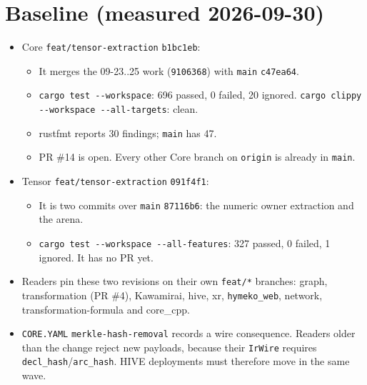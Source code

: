 \documentclass[11pt,a4paper]{article}
\newcommand{\code}[1]{\texttt{#1}}
\begin{document}
\section{Baseline (measured 2026-09-30)}
\begin{itemize}[nosep]
\item Core \code{feat/tensor-extraction} \code{b1bc1eb}:
  \begin{itemize}[nosep]
  \item It merges the 09-23..25 work (\code{9106368}) with \code{main} \code{c47ea64}.
  \item \code{cargo test -{}-workspace}: 696 passed, 0 failed, 20 ignored. \code{cargo clippy -{}-workspace -{}-all-targets}: clean.
  \item rustfmt reports 30 findings; \code{main} has 47.
  \item PR \#14 is open. Every other Core branch on \code{origin} is already in \code{main}.
  \end{itemize}
\item Tensor \code{feat/tensor-extraction} \code{091f4f1}:
  \begin{itemize}[nosep]
  \item It is two commits over \code{main} \code{87116b6}: the numeric owner extraction and the arena.
  \item \code{cargo test -{}-workspace -{}-all-features}: 327 passed, 0 failed, 1 ignored. It has no PR yet.
  \end{itemize}
\item Readers pin these two revisions on their own \code{feat/*} branches: graph, transformation (PR \#4),
  Kawamirai, hive, xr, \code{hymeko\_web}, network, transformation-formula and core\_cpp.
\item \code{CORE.YAML} \code{merkle-hash-removal} records a wire consequence. Readers older than the change
  reject new payloads, because their \code{IrWire} requires \code{decl\_hash}/\code{arc\_hash}. HIVE
  deployments must therefore move in the same wave.
\end{itemize}
\end{document}
